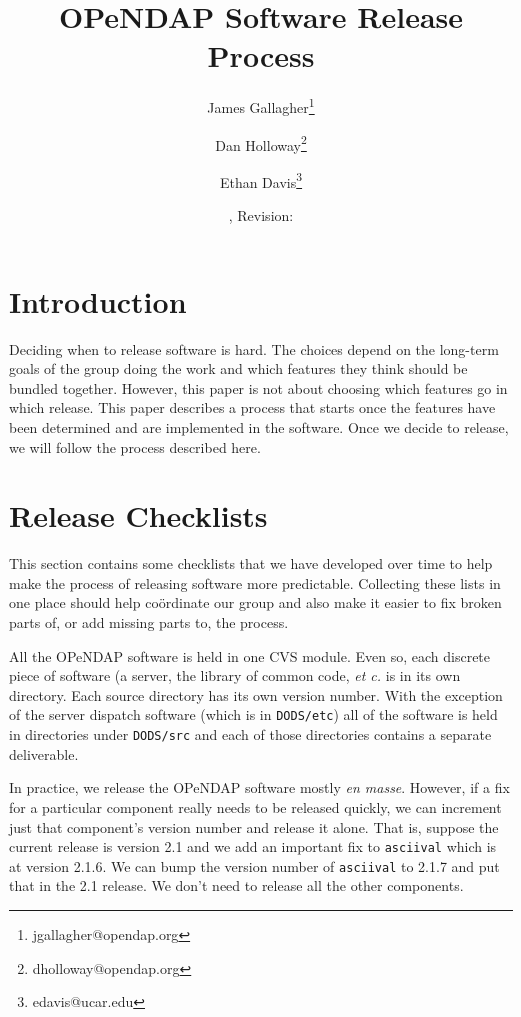 \documentclass{dods-paper}
\title{OPeNDAP Software Release Process}
\author{James Gallagher\thanks{jgallagher@opendap.org} 
  \and Dan Holloway\thanks{dholloway@opendap.org}
  \and Ethan Davis\thanks{edavis@ucar.edu}}
\date{\rcsInfoDate, Revision: \rcsInfoRevision}
\begin{document}
\maketitle



\T\tableofcontents

\section{Introduction}

Deciding when to release software is hard. The choices depend on the
long-term goals of the group doing the work and which features they think
should be bundled together. However, this paper is not about choosing which
features go in which release. This paper describes a process that starts once
the features have been determined and are implemented in the software. Once
we decide to release, we will follow the process described here.

\section{Release Checklists}

This section contains some checklists that we have developed over time to
help make the process of releasing software more predictable. Collecting these
lists in one place should help co\"ordinate our group and also make it easier
to fix broken parts of, or add missing parts to, the process. 

All the OPeNDAP software is held in one CVS module. Even so, each discrete
piece of software (a server, the library of common code, {\it et c.} is in
its own directory. Each source directory has its own version number. With the
exception of the server dispatch software (which is in \texttt{DODS/etc}) all
of the software is held in directories under \texttt{DODS/src} and each of
those directories contains a separate deliverable.

In practice, we release the OPeNDAP software mostly {\it en masse}. However,
if a fix for a particular component really needs to be released quickly, we
can increment just that component's version number and release it alone. That
is, suppose the current release is version 2.1 and we add an important fix to
\texttt{asciival} which is at version 2.1.6. We can bump the version number of
\texttt{asciival} to 2.1.7 and put that in the 2.1 release. We don't need to
release all the other components.
\end{document}
